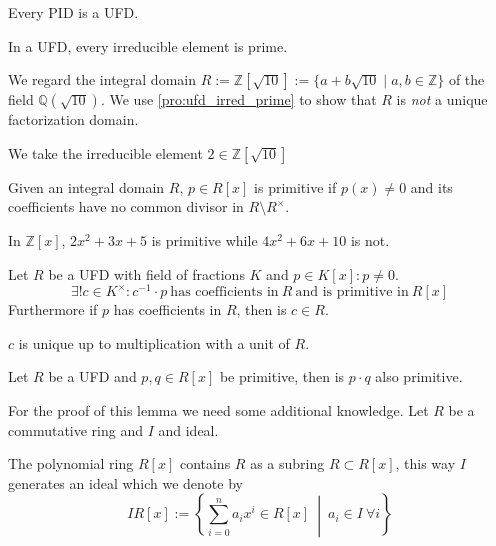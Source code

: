 \begin{proposition}
   Every PID is a UFD.
\end{proposition}

\begin{proposition}\label{pro:ufd_irred_prime}
   In a UFD, every irreducible element is prime.
\end{proposition}
\begin{example}
   We regard the integral domain \(R := \mathbb{Z}[\sqrt{10}] := \{a + b\sqrt{10} \mid a, b \in \mathbb{Z}\}\) of the field \(\mathbb{Q}(\sqrt{10})\).
   We use \cref{pro:ufd_irred_prime} to show that \(R\) is \emph{not} a unique factorization domain.

   We take the irreducible element \(2 \in \mathbb{Z}[\sqrt{10}]\)
\end{example}

\begin{definition}
   Given an integral domain \(R\), \(p \in R[x]\) is primitive if \(p(x) \neq 0\) and its coefficients have no common divisor in \(R \setminus R^\times\).
\end{definition}
\begin{example}
   In \(\mathbb{Z}[x]\), \(2x^2 + 3x + 5\) is primitive while \(4x^2 + 6x + 10\) is not.
\end{example}

\begin{lemma}\label{lem:make_poly_prim}
   Let \(R\) be a UFD with field of fractions \(K\) and \(p \in K[x]: p \neq 0\).
   \[\exists!c \in K^\times: c^{-1} \cdot p~\text{has coefficients in}~R~\text{and is primitive in}~R[x]\]
   Furthermore if \(p\) has coefficients in \(R\), then is \(c \in R\).
\end{lemma}
\begin{remark}
   \(c\) is unique up to multiplication with a unit of \(R\).
\end{remark}

\begin{lemma}
   Let \(R\) be a UFD and \(p, q \in R[x]\) be primitive, then is \(p \cdot q\) also primitive.
\end{lemma}

For the proof of this lemma we need some additional knowledge.
Let \(R\) be a commutative ring and \(I\) and ideal.

The polynomial ring \(R[x]\) contains \(R\) as a subring \(R \subset R[x]\), this way \(I\) generates an ideal which we denote by
\[IR[x] := \left\{\sum_{i=0}^n a_i x^i \in R[x] ~\middle|~ a_i \in I~\forall i\right\}\]

